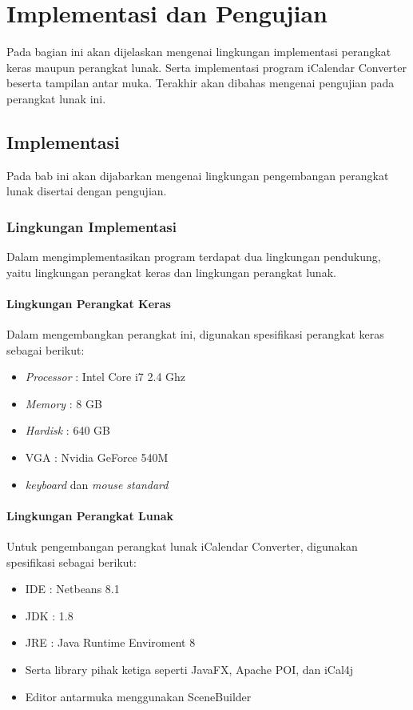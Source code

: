 \chapter{Implementasi dan Pengujian}
\label{chap:implementation}
Pada bagian ini akan dijelaskan mengenai lingkungan implementasi perangkat keras maupun perangkat lunak. Serta implementasi program iCalendar Converter beserta tampilan antar muka. Terakhir akan dibahas mengenai pengujian pada perangkat lunak ini.

\section{Implementasi}
Pada bab ini akan dijabarkan mengenai lingkungan pengembangan perangkat lunak disertai dengan pengujian.

\subsection{Lingkungan Implementasi}
Dalam mengimplementasikan program terdapat dua lingkungan pendukung, yaitu lingkungan perangkat keras dan lingkungan perangkat lunak.
\subsubsection{Lingkungan Perangkat Keras}
Dalam mengembangkan perangkat ini, digunakan spesifikasi perangkat keras sebagai berikut:
\begin{itemize}
	\item \textit{Processor} : Intel Core i7 2.4 Ghz
	\item \textit{Memory} : 8 GB
	\item \textit{Hardisk} : 640 GB
	\item VGA : Nvidia GeForce 540M
	\item \textit{keyboard} dan \textit{mouse standard}
\end{itemize}

\subsubsection{Lingkungan Perangkat Lunak}
Untuk pengembangan perangkat lunak iCalendar Converter, digunakan spesifikasi sebagai berikut:
\begin{itemize}
	\item IDE : Netbeans 8.1
	\item JDK : 1.8
	\item JRE : Java Runtime Enviroment 8
	\item Serta library pihak ketiga seperti JavaFX, Apache POI, dan iCal4j
	\item Editor antarmuka menggunakan SceneBuilder
\end{itemize}

